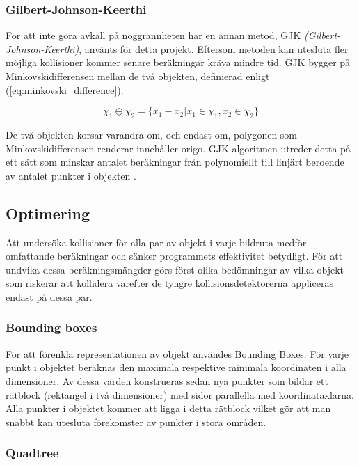 \documentclass[a4paper,12pt,twopage,swedish]{article}
\begin{document}
\subsubsection{Gilbert-Johnson-Keerthi}
För att inte göra avkall på noggrannheten har en annan metod, GJK \cite[s.~30]{vella08} \emph{(Gilbert-Johnson-Keerthi)}, använts för detta projekt. Eftersom metoden kan utesluta fler möjliga kollisioner kommer senare beräkningar kräva mindre tid. GJK bygger på Minkovskidifferensen mellan de två objekten, definierad enligt (\ref{eq:minkovski_difference}).

\begin{equation}\label{eq:minkovski_difference}
\chi_1 \ominus \chi_2 = \{x_1 - x_2|x_1 \in \chi_1, x_2 \in \chi_2\}
\end{equation}

De två objekten korsar varandra om, och endast om, polygonen som Minkovskidifferensen renderar innehåller origo. GJK-algoritmen utreder detta på ett sätt som minskar antalet beräkningar från polynomiellt till linjärt beroende av antalet punkter i objekten \cite{bergen99}.

\subsection{Optimering}

Att undersöka kollisioner för alla par av objekt i varje bildruta medför omfattande beräkningar och sänker programmets effektivitet betydligt. För att undvika dessa beräkningsmängder görs först olika bedömningar av vilka objekt som riskerar att kollidera varefter de tyngre kollisionsdetektorerna appliceras endast på dessa par.

\subsubsection{Bounding boxes}

För att förenkla representationen av objekt användes Bounding Boxes. För varje punkt i objektet beräknas den maximala respektive minimala koordinaten i alla dimensioner. Av dessa värden konstrueras sedan nya punkter som bildar ett rätblock (rektangel i två dimensioner) med sidor parallella med koordinataxlarna. Alla punkter i objektet kommer att ligga i detta rätblock vilket gör att man snabbt kan utesluta förekomster av punkter i stora områden.

\subsubsection{Quadtree}
\end{document}
